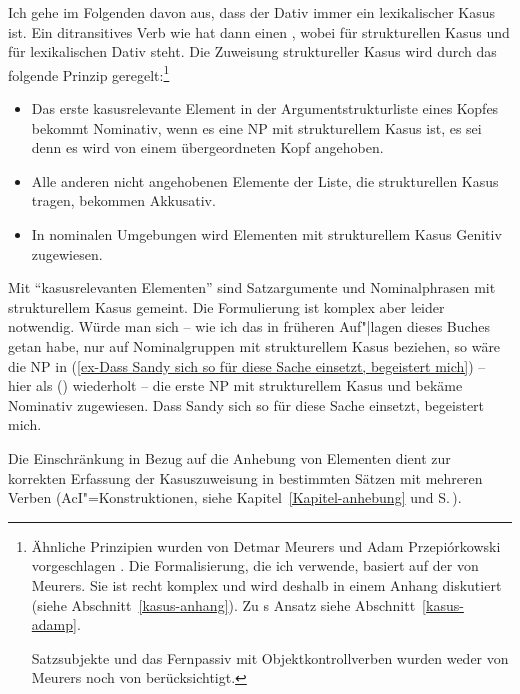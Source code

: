 Ich gehe im Folgenden davon aus, dass der Dativ immer ein lexikalischer Kasus ist. 
Ein ditransitives Verb wie  hat dann einen \compsw {},
wobei  für strukturellen Kasus und  für lexikalischen Dativ steht.
Die Zuweisung struktureller Kasus wird durch das folgende Prinzip geregelt:\footnote{
  Ähnliche Prinzipien wurden von Detmar Meurers und Adam Przepiórkowski
  vorgeschlagen \parencites[238]{Prze99}[80,93--94]{Prze99b}[206--207]{Meurers99b}[51--53]{MdK2001a}[Abschnitt~10.4.1.4]{Meurers2000b}.
  Die Formalisierung, die ich verwende, basiert auf der von Meurers. Sie ist recht komplex und wird
  deshalb in einem Anhang diskutiert (siehe Abschnitt~\ref{kasus-anhang}). Zu \prz{}s Ansatz siehe Abschnitt~\ref{kasus-adamp}.

  Satzsubjekte und das Fernpassiv mit Objektkontrollverben wurden weder von Meurers noch von \prz berücksichtigt.
%
}
\begin{prinzip-break}[Kasusprinzip]
\label{case-p}
\begin{itemize}
\item Das erste kasusrelevante Element in der Argumentstrukturliste eines Kopfes bekommt
  Nominativ, wenn es eine NP mit strukturellem Kasus ist, es sei denn es wird von einem übergeordneten Kopf angehoben. 
\item Alle anderen nicht angehobenen Elemente der Liste, die strukturellen Kasus tragen, bekommen Akkusativ.
\item In nominalen Umgebungen wird Elementen mit strukturellem Kasus Genitiv zugewiesen.
\end{itemize}
\end{prinzip-break}
Mit "`kasusrelevanten Elementen"'\label{page-kasusrelevante-XP} sind Satzargumente und Nominalphrasen mit strukturellem Kasus
gemeint. Die Formulierung ist komplex aber leider notwendig. Würde man sich -- wie ich das in
früheren Auf"|lagen dieses Buches getan habe, nur auf Nominalgruppen
mit strukturellem Kasus beziehen, so wäre die NP in (\ref{ex-Dass Sandy sich so für diese Sache
  einsetzt, begeistert mich}) -- hier als () wiederholt -- die erste NP mit strukturellem Kasus
und bekäme Nominativ zugewiesen. 
\ea
\label{ex-Dass Sandy sich so für diese Sache einsetzt, begeistert mich-zwei}%
Dass Sandy sich so für diese Sache einsetzt, begeistert mich.
\z

\noindent
Die Einschränkung in Bezug auf die Anhebung von Elementen dient zur korrekten Erfassung der
Kasuszuweisung in bestimmten Sätzen mit mehreren Verben (\zb AcI"=Konstruktionen, siehe
Kapitel~\ref{Kapitel-anhebung} und S.\,\pageref{page-aci-kasus}). 

